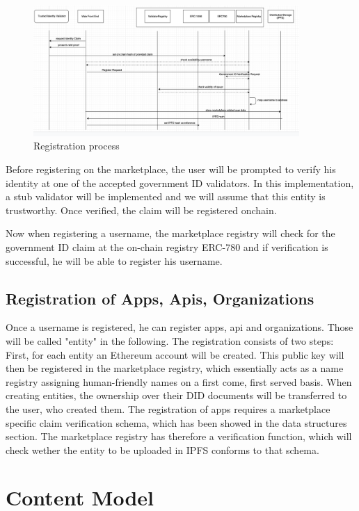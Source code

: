 \begin{figure}[htbp]
    \centerline{\includegraphics[width=0.9\textwidth]{figures/userRegistration.png}}
    \caption{Registration process \label{fig:registration}}
\end{figure}

Before registering on the marketplace, the user will be prompted to verify his identity at one of the accepted government ID validators. In this implementation, a stub validator will be implemented and we will assume that this entity is trustworthy. Once verified, the claim will be registered onchain. 

Now when registering a username, the marketplace registry will check for the government ID claim at the on-chain registry ERC-780 and if verification is successful, he will be able to register his username.

\subsection{Registration of Apps, Apis, Organizations}

Once a username is registered, he can register apps, api and organizations. Those will be called "entity" in the following. The registration consists of two steps: 
First, for each entity an Ethereum account will be created.
This public key will then be registered in the marketplace registry, which essentially acts as a name registry assigning human-friendly names on a first come, first served basis. 
When creating entities, the ownership over their DID documents will be transferred to the user, who created them. The registration of apps requires a marketplace specific claim verification schema, which has been showed in the data structures section. The marketplace registry has therefore a verification function, which will check wether the entity to be uploaded in IPFS conforms to that schema.

\section{Content Model}

